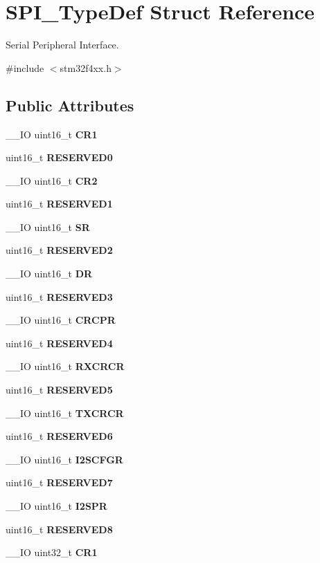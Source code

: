 \section{S\+P\+I\+\_\+\+Type\+Def Struct Reference}
\label{structSPI__TypeDef}


Serial Peripheral Interface.  




{\ttfamily \#include $<$stm32f4xx.\+h$>$}

\subsection*{Public Attributes}
\begin{DoxyCompactItemize}
\item 
\+\_\+\+\_\+\+IO uint16\+\_\+t \textbf{ C\+R1}
\item 
uint16\+\_\+t \textbf{ R\+E\+S\+E\+R\+V\+E\+D0}
\item 
\+\_\+\+\_\+\+IO uint16\+\_\+t \textbf{ C\+R2}
\item 
uint16\+\_\+t \textbf{ R\+E\+S\+E\+R\+V\+E\+D1}
\item 
\+\_\+\+\_\+\+IO uint16\+\_\+t \textbf{ SR}
\item 
uint16\+\_\+t \textbf{ R\+E\+S\+E\+R\+V\+E\+D2}
\item 
\+\_\+\+\_\+\+IO uint16\+\_\+t \textbf{ DR}
\item 
uint16\+\_\+t \textbf{ R\+E\+S\+E\+R\+V\+E\+D3}
\item 
\+\_\+\+\_\+\+IO uint16\+\_\+t \textbf{ C\+R\+C\+PR}
\item 
uint16\+\_\+t \textbf{ R\+E\+S\+E\+R\+V\+E\+D4}
\item 
\+\_\+\+\_\+\+IO uint16\+\_\+t \textbf{ R\+X\+C\+R\+CR}
\item 
uint16\+\_\+t \textbf{ R\+E\+S\+E\+R\+V\+E\+D5}
\item 
\+\_\+\+\_\+\+IO uint16\+\_\+t \textbf{ T\+X\+C\+R\+CR}
\item 
uint16\+\_\+t \textbf{ R\+E\+S\+E\+R\+V\+E\+D6}
\item 
\+\_\+\+\_\+\+IO uint16\+\_\+t \textbf{ I2\+S\+C\+F\+GR}
\item 
uint16\+\_\+t \textbf{ R\+E\+S\+E\+R\+V\+E\+D7}
\item 
\+\_\+\+\_\+\+IO uint16\+\_\+t \textbf{ I2\+S\+PR}
\item 
uint16\+\_\+t \textbf{ R\+E\+S\+E\+R\+V\+E\+D8}
\item 
\+\_\+\+\_\+\+IO uint32\+\_\+t \textbf{ C\+R1}

\end{DoxyCompactItemize}
